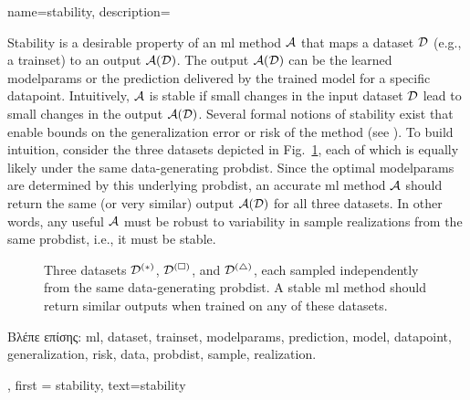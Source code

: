 {name={stability},
	description={Stability is a desirable property of an \gls{ml} method $\mathcal{A}$ that maps a 
		\gls{dataset} $\mathcal{D}$ (e.g., a \gls{trainset}) to an output $\mathcal{A}(\mathcal{D})$. The output 
		$\mathcal{A}(\mathcal{D})$ can be the learned \gls{modelparams} or the \gls{prediction} delivered 
		by the trained \gls{model} for a specific \gls{datapoint}. Intuitively, $\mathcal{A}$ is 
		stable if small changes in the input \gls{dataset} $\mathcal{D}$ lead to small changes in the 
		output $\mathcal{A}(\mathcal{D})$. Several formal notions of stability exist that enable bounds 
		on the \gls{generalization} error or \gls{risk} of the method (see \cite[Ch.~13]{ShalevMLBook}).
		To build intuition, consider the three \gls{dataset}s depicted in Fig.~\ref{fig_three_data_stability}, each 
		of which is equally likely under the same \gls{data}-generating \gls{probdist}. Since the 
		optimal \gls{modelparams} are determined by this underlying \gls{probdist}, an accurate 
		\gls{ml} method $\mathcal{A}$ should return the same (or very similar) output $\mathcal{A}(\mathcal{D})$ 
		for all three \gls{dataset}s. In other words, any useful $\mathcal{A}$ must be robust to 
		variability in \gls{sample} \gls{realization}s from the same \gls{probdist}, i.e., it must be stable. 
		\begin{figure}[H]
			\centering
			\caption{Three \gls{dataset}s $\mathcal{D}^{(*)}$, $\mathcal{D}^{(\square)}$, and $\mathcal{D}^{(\triangle)}$, 
				each sampled independently from the same \gls{data}-generating \gls{probdist}. A stable \gls{ml} 
				method should return similar outputs when trained on any of these \gls{dataset}s. \label{fig_three_data_stability}}
		\end{figure}
		\foreignlanguage{greek}{Βλέπε επίσης:} \gls{ml}, \gls{dataset}, \gls{trainset}, \gls{modelparams}, \gls{prediction}, \gls{model}, \gls{datapoint}, \gls{generalization}, \gls{risk}, \gls{data}, \gls{probdist}, \gls{sample}, \gls{realization}.
		}, 
	first = {stability}, text={stability} 
}

